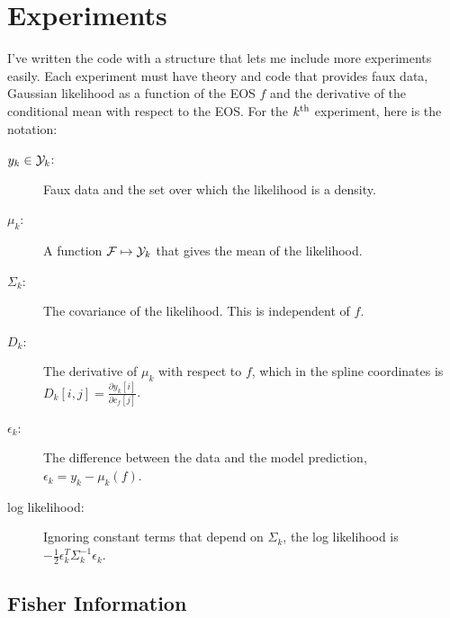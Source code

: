 \documentclass[11pt]{article}
\newcommand{\eos}{f}
\newcommand{\EOS}{{\cal F}}
\newcommand{\data}{y}
\newcommand{\DATA}{{\cal Y}}
\newcommand\cf{c_f}
\begin{document}
\section{Experiments}
\label{sec:experiments}

I've written the code with a structure that lets me include more
experiments easily.  Each experiment must have theory and code that
provides faux data, Gaussian likelihood as a function of the EOS
$\eos$ and the derivative of the conditional mean with respect to the
EOS.  For the $k^{\rm th}$ experiment, here is the notation:
\begin{description}
\item[$\data_k\in \DATA_k$:] Faux data and the set over which the
  likelihood is a density.
\item[$\mu_k$:] A function $\EOS\mapsto \DATA_k$ that gives the mean
  of the likelihood.
\item[$\Sigma_k$:] The covariance of the likelihood.  This is
  independent of $\eos$.
\item[$D_k$:] The derivative of $\mu_k$ with respect to $\eos$, which
  in the spline coordinates is
  $D_k[i,j] =\frac{\partial \data_k[i]}{\partial \cf[j]}$.
\item[$\epsilon_k$:] The difference between the data and the model
  prediction, $\epsilon_k = \data_k - \mu_k(\eos)$.
\item[log likelihood:] Ignoring constant terms that depend on
  $\Sigma_k$, the log likelihood is $-\frac{1}{2}\epsilon_k^T
  \Sigma_k^{-1} \epsilon_k$.
\end{description}

\subsection{Fisher Information}
\label{sec:fisher-information}
\end{document}
